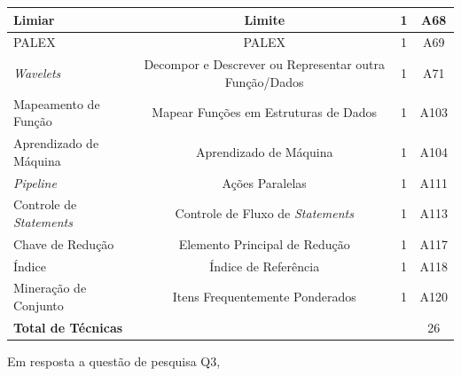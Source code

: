 \begin{table}[h]
{\begin{tabular}{@{}lccc@{}}
			Limiar                         &   Limite                                                          & 1          & A68                                                                                                   \\\hline
			PALEX                          &  PALEX                                                           & 1          & A69                                                                                                   \\\hline
			\textit{Wavelets}                       &  Decompor e Descrever ou Representar 
			outra Função/Dados                                                         & 1          & A71                                                                                                   \\\hline
			Mapeamento de Função
			
			&  Mapear Funções em Estruturas de Dados                                                         & 1          & A103                                                                                                  \\\hline
			Aprendizado de Máquina
			
			&   Aprendizado de Máquina                                                        & 1          & A104                                                                                                  \\\hline
			\textit{Pipeline}
			&   Ações Paralelas                                                         & 1          & A111                                                                                                   \\\hline
			Controle de \textit{Statements} & Controle de Fluxo de \textit{Statements} & 1   & A113      \\\hline
			Chave de Redução & Elemento Principal de Redução & 1   & A117      \\\hline
			Índice  & Índice de Referência & 1   & A118      \\\hline
			Mineração de Conjunto 
			& Itens Frequentemente Ponderados & 1   & A120      \\
			\bottomrule \toprule
			\textbf{Total de Técnicas }&& &26 \\
			\bottomrule
		\end{tabular}
	}
\end{table}

Em resposta a questão de pesquisa Q3,
\newline

